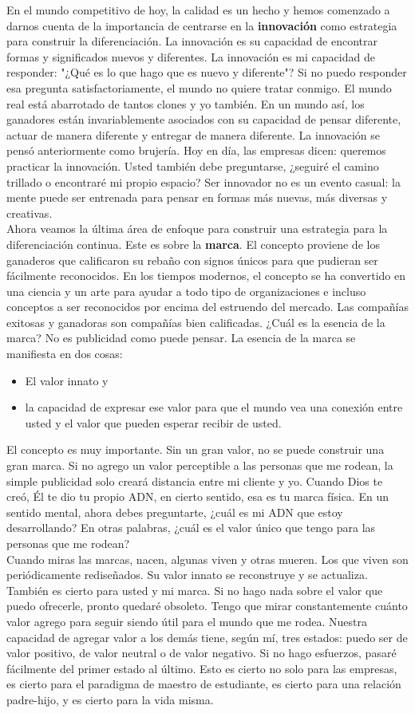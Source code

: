 \documentclass[10pt]{book}
\begin{document}
En el mundo competitivo de hoy, la calidad es un hecho y hemos comenzado a darnos cuenta de la importancia de centrarse en la \textbf{innovación} como estrategia para construir la diferenciación. La innovación es su capacidad de encontrar formas y significados nuevos y diferentes. La innovación es mi capacidad de responder: "¿Qué es lo que hago que es nuevo y diferente"? Si no puedo responder esa pregunta satisfactoriamente, el mundo no quiere tratar conmigo. El mundo real está abarrotado de tantos clones y yo también. En un mundo así, los ganadores están invariablemente asociados con su capacidad de pensar diferente, actuar de manera diferente y entregar de manera diferente. La innovación se pensó anteriormente como brujería. Hoy en día, las empresas dicen: queremos practicar la innovación. Usted también debe preguntarse, ¿seguiré el camino trillado o encontraré mi propio espacio? Ser innovador no es un evento casual: la mente puede ser entrenada para pensar en formas más nuevas, más diversas y creativas.\\
Ahora veamos la última área de enfoque para construir una estrategia para la diferenciación continua. Este es sobre la \textbf{marca}. El concepto proviene de los ganaderos que calificaron su rebaño con signos únicos para que pudieran ser fácilmente reconocidos. En los tiempos modernos, el concepto se ha convertido en una ciencia y un arte para ayudar a todo tipo de organizaciones e incluso conceptos a ser reconocidos por encima del estruendo del mercado. Las compañías exitosas y ganadoras son compañías bien calificadas. ¿Cuál es la esencia de la marca? No es publicidad como puede pensar. La esencia de la marca se manifiesta en dos cosas: 
\begin{itemize}
\item El valor innato y
\item  la capacidad de expresar ese valor para que el mundo vea una conexión entre usted y el valor que pueden esperar recibir de usted.
\end{itemize} 
El concepto es muy importante. Sin un gran valor, no se puede construir una gran marca. Si no agrego un valor perceptible a las personas que me rodean, la simple publicidad solo creará distancia entre mi cliente y yo. Cuando Dios te creó, Él te dio tu propio ADN, en cierto sentido, esa es tu marca física. En un sentido mental, ahora debes preguntarte, ¿cuál es mi ADN que estoy desarrollando? En otras palabras, ¿cuál es el valor único que tengo para las personas que me rodean?\\
Cuando miras las marcas, nacen, algunas viven y otras mueren. Los que viven son periódicamente rediseñados. Su valor innato se reconstruye y se actualiza. También es cierto para usted y mi marca. Si no hago nada sobre el valor que puedo ofrecerle, pronto quedaré obsoleto. Tengo que mirar constantemente cuánto valor agrego para seguir siendo útil para el mundo que me rodea. Nuestra capacidad de agregar valor a los demás tiene, según mí, tres estados: puedo ser de valor positivo, de valor neutral o de valor negativo. Si no hago esfuerzos, pasaré fácilmente del primer estado al último. Esto es cierto no solo para las empresas, es cierto para el paradigma de maestro de estudiante, es cierto para una relación padre-hijo, y es cierto para la vida misma.\\
\end{document}
